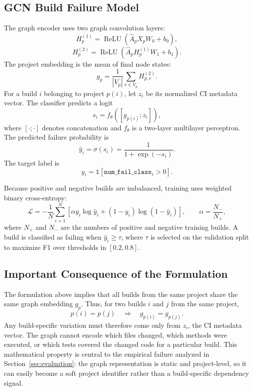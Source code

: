 \subsection{GCN Build Failure Model}

The graph encoder uses two graph convolution layers:
\[
H_p^{(1)}=\operatorname{ReLU}(\hat{A}_pX_pW_0+b_0),
\]
\[
H_p^{(2)}=\operatorname{ReLU}(\hat{A}_pH_p^{(1)}W_1+b_1).
\]
The project embedding is the mean of final node states:
\[
g_p=\frac{1}{|V_p|}\sum_{v\in V_p}H_{p,v}^{(2)}.
\]
For a build $i$ belonging to project $p(i)$, let $z_i$ be its normalized CI metadata vector. The classifier predicts a logit
\[
s_i = f_\theta([g_{p(i)};z_i]),
\]
where $[\cdot;\cdot]$ denotes concatenation and $f_\theta$ is a two-layer multilayer perceptron. The predicted failure probability is
\[
\hat{y}_i=\sigma(s_i)=\frac{1}{1+\exp(-s_i)}.
\]
The target label is
\[
y_i=\mathbb{1}[\texttt{num\_fail\_class}_i>0].
\]

Because positive and negative builds are imbalanced, training uses weighted binary cross-entropy:
\[
\mathcal{L}
=-\frac{1}{N}\sum_{i=1}^{N}
\left[
\alpha y_i\log \hat{y}_i
+(1-y_i)\log(1-\hat{y}_i)
\right],
\qquad
\alpha=\frac{N_-}{N_+},
\]
where $N_+$ and $N_-$ are the numbers of positive and negative training builds. A build is classified as failing when $\hat{y}_i\ge \tau$, where $\tau$ is selected on the validation split to maximize F1 over thresholds in $[0.2,0.8]$.


\subsection{Important Consequence of the Formulation}

The formulation above implies that all builds from the same project share the same graph embedding $g_p$. Thus, for two builds $i$ and $j$ from the same project,
\[
p(i)=p(j)\quad\Longrightarrow\quad g_{p(i)}=g_{p(j)}.
\]
Any build-specific variation must therefore come only from $z_i$, the CI metadata vector. The graph cannot encode which files changed, which methods were executed, or which tests covered the changed code for a particular build. This mathematical property is central to the empirical failure analyzed in Section~\ref{sec:evaluation}: the graph representation is static and project-level, so it can easily become a soft project identifier rather than a build-specific dependency signal.
